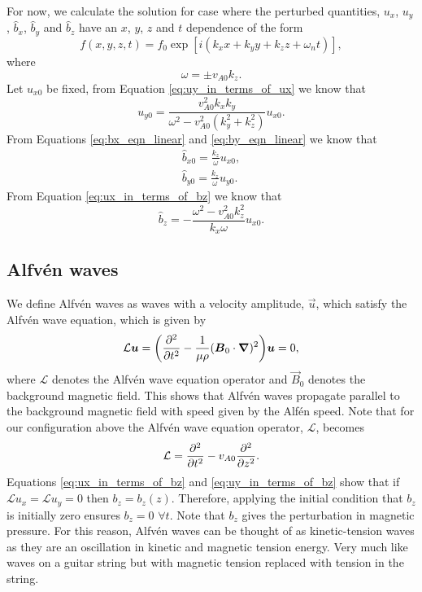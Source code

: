 For now, we calculate the solution for case where the perturbed quantities, $u_x$, $u_y$, $\hat{b}_x$, $\hat{b}_y$ and $\hat{b}_z$ have an $x$, $y$, $z$ and $t$ dependence of the form
\[f(x,y,z,t)=f_0\exp[i(k_xx + k_y y + k_z z + \omega_n t)],\]
where
\[\omega = \pm v_{A0}k_z.\]
Let $u_{x0}$ be fixed, from Equation \eqref{eq:uy_in_terms_of_ux} we know that
\begin{equation}
    \label{eq:uy0}
    u_{y0} = \frac{v_{A0}^2 k_x k_y}{\omega^2 - v_{A0}^2(k_y^2 + k_z^2)}u_{x0}.
\end{equation}
From Equations \eqref{eq:bx_eqn_linear} and \eqref{eq:by_eqn_linear} we know that
\begin{gather}
    \label{eq:bx0}
    \hat{b}_{x0} = \frac{k_z}{\omega}u_{x0}, \\
    \label{eq:by0}
    \hat{b}_{y0} = \frac{k_z}{\omega}u_{y0}.
\end{gather}
From Equation \eqref{eq:ux_in_terms_of_bz} we know that
\begin{equation}
    \label{eq:bz0}
    \hat{b}_z = -\frac{\omega^2 - v_{A0}^2k_z^2}{k_x \omega} u_{x0}.
\end{equation}


\subsection{Alfv\'en waves}

We define Alfv\'en waves \citep{Alfven1942} as waves with a velocity amplitude, $\vec{u}$, which satisfy the Alfv\'en wave equation, which is given by
\begin{equation}
    \label{eq:alfven_wave_equation}
    \mathcal{L}\boldsymbol{u} = \qty(\pdv[2]{}{t} - \frac{1}{\mu\rho}(\boldsymbol{B}_0\cdot\grad)^2)\boldsymbol{u}=0,
\end{equation}
where $\mathcal{L}$ denotes the Alfv\'en wave equation operator and $\vec{B}_0$ denotes the background magnetic field. This shows that Alfv\'en waves propagate parallel to the background magnetic field with speed given by the Alf\'en speed. Note that for our configuration above the Alfv\'en wave equation operator, $\mathcal{L}$, becomes
\begin{equation}
    \label{eq:alfven_wave_equation_operator}
    \mathcal{L} = \pdv[2]{}{t} - v_{A0}\pdv[2]{}{z}.
\end{equation}
Equations \eqref{eq:ux_in_terms_of_bz} and \eqref{eq:uy_in_terms_of_bz} show that if $\mathcal{L}u_x=\mathcal{L}u_y=0$ then $b_z=b_z(z)$. Therefore, applying the initial condition that $b_z$ is initially zero ensures $b_z=0$ $\forall t$. Note that $b_z$ gives the perturbation in magnetic pressure. For this reason, Alfv\'en waves can be thought of as kinetic-tension waves as they are an oscillation in kinetic and magnetic tension energy. Very much like waves on a guitar string but with magnetic tension replaced with tension in the string.

